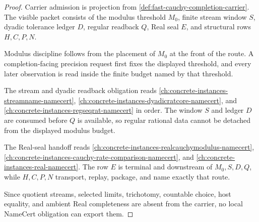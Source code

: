 \begin{proof}
Carrier admission is projection from \autoref{def:fast-cauchy-completion-carrier}. The visible packet consists of the modulus threshold $M_0$, finite stream window $S$, dyadic tolerance ledger $D$, regular readback $Q$, Real seal $E$, and structural rows $H,C,P,N$.

Modulus discipline follows from the placement of $M_0$ at the front of the route. A completion-facing precision request first fixes the displayed threshold, and every later observation is read inside the finite budget named by that threshold.

The stream and dyadic readback obligation reads \autoref{ch:concrete-instances-streamname-namecert}, \autoref{ch:concrete-instances-dyadicratcore-namecert}, and \autoref{ch:concrete-instances-regseqrat-namecert} in order. The window $S$ and ledger $D$ are consumed before $Q$ is available, so regular rational data cannot be detached from the displayed modulus budget.

The Real-seal handoff reads \autoref{ch:concrete-instances-realcauchymodulus-namecert}, \autoref{ch:concrete-instances-cauchy-rate-comparison-namecert}, and \autoref{ch:concrete-instances-real-namecert}. The row $E$ is terminal and downstream of $M_0,S,D,Q$, while $H,C,P,N$ transport, replay, package, and name exactly that route.

Since quotient streams, selected limits, trichotomy, countable choice, host equality, and ambient Real completeness are absent from the carrier, no local NameCert obligation can export them.
\end{proof}

